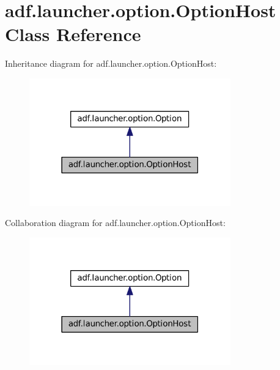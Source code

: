 \hypertarget{classadf_1_1launcher_1_1option_1_1OptionHost}{}\section{adf.\+launcher.\+option.\+Option\+Host Class Reference}
\label{classadf_1_1launcher_1_1option_1_1OptionHost}


Inheritance diagram for adf.\+launcher.\+option.\+Option\+Host\+:
\nopagebreak
\begin{figure}[H]
\begin{center}
\leavevmode
\includegraphics[width=247pt]{classadf_1_1launcher_1_1option_1_1OptionHost__inherit__graph}
\end{center}
\end{figure}


Collaboration diagram for adf.\+launcher.\+option.\+Option\+Host\+:
\nopagebreak
\begin{figure}[H]
\begin{center}
\leavevmode
\includegraphics[width=247pt]{classadf_1_1launcher_1_1option_1_1OptionHost__coll__graph}
\end{center}
\end{figure}
